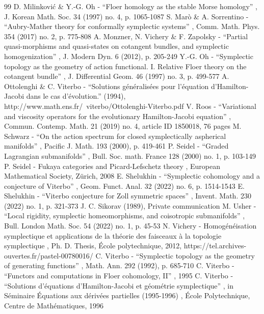 \documentclass[10pt]{amsart}
\theoremstyle{definition}
\begin{document}
\begin{thebibliography}{99}
 D. Milinković \& Y.-G. Oh - “Floer homology as the stable Morse homology” , J. Korean Math. Soc. 34 (1997) no. 4, p. 1065-1087
 S. Marò \& A. Sorrentino - “Aubry-Mather theory for conformally symplectic systems” , Comm. Math. Phys. 354 (2017) no. 2, p. 775-808
 A. Monzner, N. Vichery \& F. Zapolsky - “Partial quasi-morphisms and quasi-states on cotangent bundles, and symplectic homogenization” , J. Modern Dyn. 6 (2012), p. 205-249
 Y.-G. Oh - “Symplectic topology as the geometry of action functional. I. Relative Floer theory on the cotangent bundle” , J. Differential Geom. 46 (1997) no. 3, p. 499-577
 A. Ottolenghi \& C. Viterbo - “Solutions généralisées pour l’équation d’Hamilton-Jacobi dans le cas d’évolution.” (1994), http://www.math.ens.fr/~viterbo/Ottolenghi-Viterbo.pdf
 V. Roos - “Variational and viscosity operators for the evolutionary Hamilton-Jacobi equation” , Commun. Contemp. Math. 21 (2019) no. 4, article ID 1850018, 76 pages
 M. Schwarz - “On the action spectrum for closed symplectically aspherical manifolds” , Pacific J. Math. 193 (2000), p. 419-461
 P. Seidel - “Graded Lagrangian submanifolds” , Bull. Soc. math. France 128 (2000) no. 1, p. 103-149
 P. Seidel - Fukaya categories and Picard-Lefschetz theory , European Mathematical Society, Zürich, 2008
 E. Shelukhin - “Symplectic cohomology and a conjecture of Viterbo” , Geom. Funct. Anal. 32 (2022) no. 6, p. 1514-1543
 E. Shelukhin - “Viterbo conjecture for Zoll symmetric spaces” , Invent. Math. 230 (2022) no. 1, p. 321-373
 J. C. Sikorav (1989), Private communication
 M. Usher - “Local rigidity, symplectic homeomorphisms, and coisotropic submanifolds” , Bull. London Math. Soc. 54 (2022) no. 1, p. 45-53
 N. Vichery - Homogénéisation symplectique et applications de la théorie des faisceaux à la topologie symplectique , Ph. D. Thesis, École polytechnique, 2012, https://tel.archives-ouvertes.fr/pastel-00780016/
 C. Viterbo - “Symplectic topology as the geometry of generating functions” , Math. Ann. 292 (1992), p. 685-710
 C. Viterbo - “Functors and computations in Floer cohomology, II” , 1995
 C. Viterbo - “Solutions d’équations d’Hamilton-Jacobi et géométrie symplectique” , in Séminaire Équations aux dérivées partielles (1995-1996) , École Polytechnique, Centre de Mathématiques, 1996

\end{thebibliography}
\end{document}
